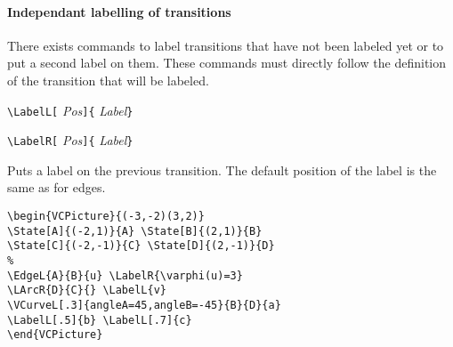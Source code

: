 \documentclass[11pt,twoside]{article}
\newlength{\ColoText}%
\newlength{\ColoFigu}%
\newlength{\parindenttemp} %
\newcommand{\noi}{\noindent}
\newlength{\jsIndent}%
\newlength{\ColSource}%
\newlength{\ColFigur}%
\begin{document}
\paragraph{Independant labelling of transitions}
\medskip
There exists commands to label transitions that
have not been labeled yet or to put a second label on them.
These commands must directly follow the definition of
the transition that will be labeled.

\noi 
\hspace*{-\jsIndent}
\begin{minipage}[t]{\ColoText}
        \par\vspace*{0mm}%
        \footnotesize
\verb+\LabelL[+%
   \textsl{Pos}\verb+]{+%
   \textsl{Label}\verb+}+
   
\medskip 
\verb+\LabelR[+%
   \textsl{Pos}\verb+]{+%
   \textsl{Label}\verb+}+
\end{minipage}%
\hspace*{1.2em}%
\begin{minipage}[t]{\ColoFigu}%
\par\vspace*{0mm}%
Puts a label on the previous transition. The default position of the label
is the same as for edges.
\end{minipage}%


\medskip
\noi 
\hspace*{-\jsIndent}
\begin{minipage}[c]{\ColFigur}%
\par\vspace*{0mm}%
\begin{center}
{}%
\end{center}
\end{minipage}%
\hspace*{1.2em}%
\begin{minipage}[c]{\ColSource}
\setlength{\parindent}{\parindenttemp}%
\par\vspace*{0mm}%
\footnotesize
\begin{verbatim}
\begin{VCPicture}{(-3,-2)(3,2)}
\State[A]{(-2,1)}{A} \State[B]{(2,1)}{B}
\State[C]{(-2,-1)}{C} \State[D]{(2,-1)}{D}
%
\EdgeL{A}{B}{u} \LabelR{\varphi(u)=3}
\LArcR{D}{C}{} \LabelL{v}
\VCurveL[.3]{angleA=45,angleB=-45}{B}{D}{a}
\LabelL[.5]{b} \LabelL[.7]{c}
\end{VCPicture}
\end{verbatim}
\normalsize
\end{minipage}%
\end{document}
